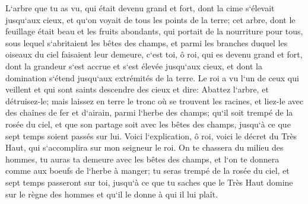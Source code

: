 \verse L`arbre que tu as vu, qui était devenu grand et fort, dont la cime s`élevait jusqu`aux cieux, et qu`on voyait de tous les points de la terre; 
\verse cet arbre, dont le feuillage était beau et les fruits abondants, qui portait de la nourriture pour tous, sous lequel s`abritaient les bêtes des champs, et parmi les branches duquel les oiseaux du ciel faisaient leur demeure, 
\verse c`est toi, ô roi, qui es devenu grand et fort, dont la grandeur s`est accrue et s`est élevée jusqu`aux cieux, et dont la domination s`étend jusqu`aux extrémités de la terre. 
\verse Le roi a vu l`un de ceux qui veillent et qui sont saints descendre des cieux et dire: Abattez l`arbre, et détruisez-le; mais laissez en terre le tronc où se trouvent les racines, et liez-le avec des chaînes de fer et d`airain, parmi l`herbe des champs; qu`il soit trempé de la rosée du ciel, et que son partage soit avec les bêtes des champs, jusqu`à ce que sept temps soient passés sur lui. 
\verse Voici l`explication, ô roi, voici le décret du Très Haut, qui s`accomplira sur mon seigneur le roi. 
\verse On te chassera du milieu des hommes, tu auras ta demeure avec les bêtes des champs, et l`on te donnera comme aux boeufs de l`herbe à manger; tu seras trempé de la rosée du ciel, et sept temps passeront sur toi, jusqu`à ce que tu saches que le Très Haut domine sur le règne des hommes et qu`il le donne à qui il lui plaît. 
